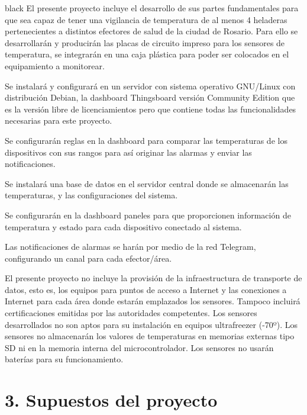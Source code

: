 \documentclass[11pt]{charter}
\begin{document}
\begin{consigna}{black}
El presente proyecto incluye el desarrollo de sus partes fundamentales para que sea capaz de tener una vigilancia de temperatura de al menos 4 heladeras pertenecientes a distintos efectores de salud de la ciudad de Rosario. 
Para ello se desarrollarán y producirán las placas de circuito impreso para los sensores de temperatura, se integrarán en una caja plástica para poder ser colocados en el equipamiento a monitorear.

Se instalará y configurará en un servidor con sistema operativo GNU/Linux con distribución Debian, la dashboard Thingsboard versión Community Edition que es la versión libre de licenciamientos pero que contiene todas las funcionalidades necesarias para este proyecto.

Se configurarán reglas en la dashboard para comparar las temperaturas de los dispositivos con sus rangos para así originar las alarmas y enviar las notificaciones.

Se instalará una base de datos en el servidor central donde se almacenarán las temperaturas, y las configuraciones del sistema.

Se configurarán en la dashboard paneles para que proporcionen información de temperatura y estado para cada dispositivo conectado al sistema.

Las notificaciones de alarmas se harán por medio de la red Telegram, configurando un canal para cada efector/área.


El presente proyecto no incluye la provisión de la infraestructura de transporte de datos, esto es, los equipos para puntos de acceso a Internet y las conexiones a Internet para cada área donde estarán emplazados los sensores. Tampoco incluirá certificaciones emitidas por las autoridades competentes.
Los sensores desarrollados no son aptos para su instalación en equipos ultrafreezer (-70º).
Los sensores no almacenarán los valores de temperaturas en memorias externas tipo SD ni en la memoria interna del microcontrolador.
Los sensores no usarán baterías para su funcionamiento.

\end{consigna}


\section{3. Supuestos del proyecto}
\label{sec:supuestos}
\end{document}
